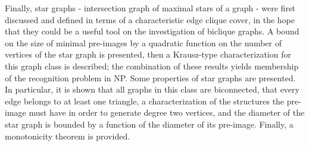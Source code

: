 Finally, star graphs - intersection graph of maximal stars of a graph - were first discussed and defined in terms of a characteristic edge clique cover, in the hope that they could be a useful tool on the investigation of biclique graphs.
A bound on the size of minimal pre-images by a quadratic function on the number of vertices of the star graph is presented, then a Krausz-type characterization for this graph class is described; the combination of these results yields membership of the recognition problem in \textsf{NP}.
Some properties of star graphs are presented. In particular, it is shown that all graphs in this class are biconnected, that every edge belongs to at least one triangle, a characterization of the structures the pre-image must have in order to generate degree two vertices, and the diameter of the star graph is bounded by a function of the diameter of its pre-image. Finally, a monotonicity theorem is provided.
